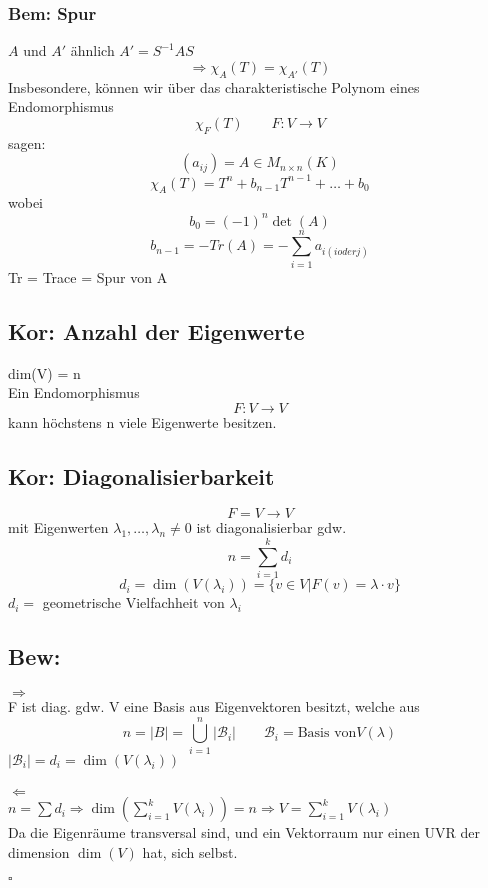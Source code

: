 \documentclass[titlepage,12pt,a4paper,ngerman]{report}
\begin{document}
\subsubsection{Bem: Spur} $A$ und $A'$ ähnlich $A' = S^{-1} A S $
$$\Rightarrow \chi_A (T) = \chi_{A'} (T)$$
Insbesondere, können wir über das charakteristische Polynom eines Endomorphismus
$$\chi_F(T) \qquad F: V\to V$$
sagen:
$$(a_{ij}) = A \in M_{n\times n} (K) $$
$$\chi_A(T) = T^n + b_{n-1} T^{n-1}+ \dots + b_0$$
wobei $$b_0 = (-1) ^n \det(A)$$
$$b_{n-1} = - Tr(A) = -\sum_{i=1}^{n} a_{i(i oder j)}$$
Tr = Trace = Spur von A

\subsection{Kor: Anzahl der Eigenwerte} dim(V) = n\\
Ein Endomorphismus
$$F: V\to V $$ kann höchstens n viele Eigenwerte besitzen.

\subsection{Kor: Diagonalisierbarkeit} $$F= V \to V $$
mit Eigenwerten $\lambda_1, \dots , \lambda_n \neq 0$ ist diagonalisierbar gdw.
$$n = \sum _{i=1}^k d_i$$
$$ d_i = \dim(V(\lambda_i)) = \{v\in V \vert F(v) = \lambda \cdot v\}$$
$d_i =$ geometrische Vielfachheit von $\lambda_i$

\subsection{Bew: }$\Rightarrow$ \\
F ist diag. gdw. V eine Basis aus Eigenvektoren besitzt, welche aus 
$$n = |B| = \bigcup_{i=1}^{n} |\mathcal{B}_i| \qquad \mathcal{B}_i = \textrm{Basis von} V(\lambda)$$
$\vert \mathcal{B}_i \vert = d_i = \dim(V(\lambda_i))$\\\\
$\Leftarrow$\\
$n = \sum d_i \Rightarrow \dim(\sum_{i=1}^{k} V(\lambda_i)) = n \Rightarrow V = \sum_{i=1}^k V(\lambda_i)$ \\
Da die Eigenräume transversal sind, und ein Vektorraum nur einen UVR der dimension $\dim(V)$ hat, sich selbst.
\begin{flushright}
	$\square$
\end{flushright}


\end{document}
